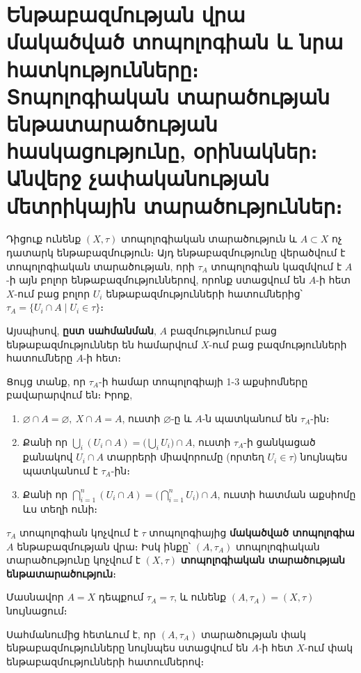 \documentclass[./main.tex]{subfiles}
\begin{document}
\onehalfspacing
\section{Ենթաբազմության վրա մակածված տոպոլոգիան և նրա հատկությունները։ Տոպոլոգիական տարածության ենթա\-տա\-րա\-ծու\-թյան հասկացությունը, օրինակներ։ Անվերջ չափակա\-նու\-թյան մետ\-րի\-կային տարածություններ։}\label{sec:11}

\par Դիցուք ունենք $(X, \tau)$ տոպոլոգիական տարածություն և $A \subset X$ ոչ դատարկ են\-թա\-բազ\-մու\-թյուն։ Այդ ենթաբազմությունը վերածվում է տոպոլոգիական տարածու\-թյան, որի $\tau_A$ տոպոլոգիան կազմվում է $A$-ի այն բոլոր ենթաբազմություններով, որոնք ստացվում են $A$-ի հետ $X$-ում բաց բոլոր $U_i$ ենթաբազմությունների հատում\-ներից՝
$\tau_A =\{U_i \cap A\mid U_i \in \tau \}$։

\par Այսպիսով, \textbf{ըստ սահմանման}, $A$ բազմությունում բաց ենթաբազմություններ են համարվում $X$-ում բաց բազմությունների հատումները $A$-ի հետ։
\par Ցույց տանք, որ $\tau_A$-ի համար տոպոլոգիայի 1-3 աքսիոմները բավարարվում են։
Իրոք,
\begin{enumerate}
    \item $\varnothing \cap A= \varnothing,\ X \cap A=A$, ուստի $\varnothing$-ը և $A$-ն պատկանում են $\tau_A$-ին։
    \item Քանի որ $\bigcup\limits_i (U_i \cap A)=\Big(\bigcup\limits_i U_i\Big) \cap A$, ուստի  $\tau_A$-ի ցանկացած քանակով $U_i \cap A$ տարրերի միավորումը (որտեղ $U_i \in \tau$) նույնպես պատկանում է $\tau_A$-ին։
    \item Քանի որ $\bigcap\limits_{i=1}^n(U_i \cap A)=\Big(\bigcap\limits_{i=1}^n U_i\Big) \cap A$, ուստի հատման աքսիոմը ևս տեղի ունի։ 
\end{enumerate}

\begin{definition}
$\tau_A$ տոպոլոգիան կոչվում է $\tau$ տոպոլոգիայից \textbf{մակածված տո\-պո\-լո\-գիա} $A$ ենթաբազմության վրա։ Իսկ ինքը՝ $(A, \tau_A)$  տոպոլոգիական տարածությունը կոչվում է $(X, \tau)$ \textbf{տոպոլոգիական տարածության ենթատարածություն}։\par Մասնավոր $A=X$ դեպքում $\tau_A=\tau$, և ունենք $(A,\tau_A)=(X,\tau)$ նույնացում։
\end{definition} %
\par Սահմանումից հետևում է, որ $(A, \tau_A)$ տարածության փակ ենթաբազմությունները նույնպես ստացվում են $A$-ի հետ $X$-ում փակ ենթաբազմությունների հատումներով։
\end{document}
